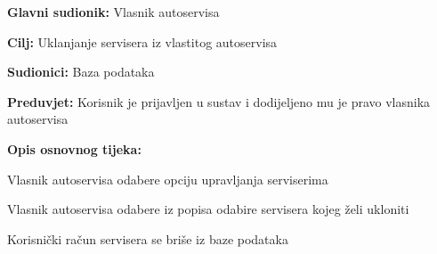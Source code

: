 					\noindent {}
					\begin{packed_item}
						
						\item \textbf{Glavni sudionik: } Vlasnik autoservisa
						\item  \textbf{Cilj:} Uklanjanje servisera iz vlastitog autoservisa
						\item  \textbf{Sudionici:} Baza podataka
						\item  \textbf{Preduvjet:} Korisnik je prijavljen u sustav i dodijeljeno mu je pravo vlasnika autoservisa
						\item  \textbf{Opis osnovnog tijeka:}
						
						\item[] \begin{packed_enum}
							
							\item Vlasnik autoservisa odabere opciju upravljanja serviserima
							\item Vlasnik autoservisa odabere iz popisa odabire servisera kojeg želi ukloniti
							\item Korisnički račun servisera se briše iz baze podataka
							
						\end{packed_enum}
					\end{packed_item}


